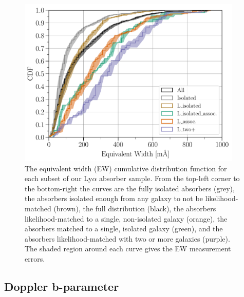 \documentclass[twocolumn,tighten]{aastex62}
\begin{document}
\begin{figure}[ht!]
        \centering
        \vspace{0pt}
        \includegraphics[width=0.95\textwidth]{hist(EW)_all6_bins10_6alt_min_maxEW_0_10000_err.pdf}
        \caption{\small{The equivalent width (EW) cumulative distribution function for each subset of our Ly$\alpha$ absorber sample. From the top-left corner to the bottom-right the curves are the fully isolated absorbers (grey), the absorbers isolated enough from any galaxy to not be likelihood-matched (brown), the full distribution (black), the absorbers likelihood-matched to a single, non-isolated galaxy (orange), the absorbers matched to a single, isolated galaxy (green), and the absorbers likelihood-matched with two or more galaxies (purple). The shaded region around each curve gives the EW measurement errors.}}
        \vspace{-5pt}
        \label{cdf_ew}
\end{figure}


\subsection{Doppler b-parameter}
\end{document}

